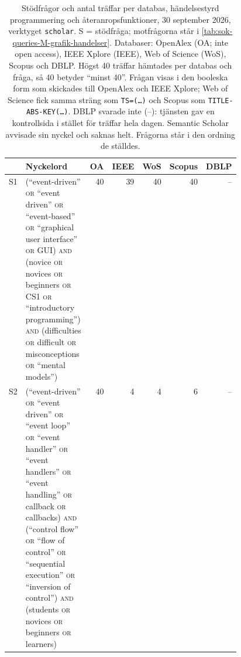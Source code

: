 \begin{table}[htbp]
  \centering
  \caption{Stödfrågor och antal träffar per databas, händelsestyrd
    programmering och återanropsfunktioner, 30 september 2026, verktyget
    \texttt{scholar}.  S = stödfråga; motfrågorna står i
    \cref{tab:sok-queries-M-grafik-handelser}.  Databaser: OpenAlex
    (OA; inte \foreignlanguage{english}{open access}), IEEE Xplore
    (IEEE), Web of Science (WoS), Scopus och DBLP.  Högst 40 träffar
    hämtades per databas och fråga, så 40 betyder \enquote{minst 40}.
    Frågan visas i den booleska form som skickades till OpenAlex och IEEE
    Xplore; Web of Science fick samma sträng som
    \texttt{TS=(\dots)} och Scopus som \texttt{TITLE-ABS-KEY(\dots)}.
    DBLP svarade inte (--): tjänsten gav en kontrollsida i stället för
    träffar hela dagen.  Semantic Scholar avvisade sin nyckel och saknas
    helt.  Frågorna står i den ordning de ställdes.}
  \label{tab:sok-queries-grafik-handelser}
  \scriptsize
  \begin{tabular}{@{}lp{0.46\linewidth}rrrrr@{}}
    \toprule
    & Nyckelord & OA & IEEE & WoS & Scopus & DBLP \\
    \midrule
    S1 & (\enquote{event-driven} \textsc{or} \enquote{event driven}
       \textsc{or} \enquote{event-based} \textsc{or} \enquote{graphical
       user interface} \textsc{or} GUI) \textsc{and} (novice \textsc{or}
       novices \textsc{or} beginners \textsc{or} CS1 \textsc{or}
       \enquote{introductory programming}) \textsc{and} (difficulties
       \textsc{or} difficult \textsc{or} misconceptions \textsc{or}
       \enquote{mental models})
       & 40 & 39 & 40 & 40 & -- \\
    S2 & (\enquote{event-driven} \textsc{or} \enquote{event driven}
       \textsc{or} \enquote{event loop} \textsc{or} \enquote{event
       handler} \textsc{or} \enquote{event handlers} \textsc{or}
       \enquote{event handling} \textsc{or} callback \textsc{or}
       callbacks) \textsc{and} (\enquote{control flow} \textsc{or}
       \enquote{flow of control} \textsc{or} \enquote{sequential
       execution} \textsc{or} \enquote{inversion of control})
       \textsc{and} (students \textsc{or} novices \textsc{or} beginners
       \textsc{or} learners)
       & 40 & 4 & 4 & 6 & -- \\

\end{tabular}
\end{table}
